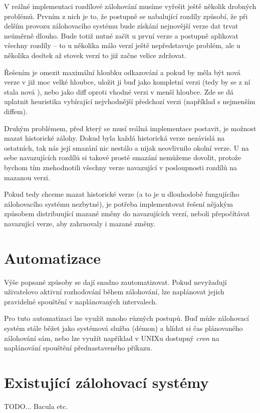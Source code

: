 V reálné implementaci rozdílové zálohování musíme vyřešit ještě několik drobných
problémů. Prvním z nich je to, že postupně se nabalující rozdíly způsobí, že
při delším provozu zálohovacího systému bude získání nejnovější verze dat trvat
neúměrně dlouho. Bude totiž nutné začít u první verze a postupně aplikovat
všechny rozdíly -- to u několika málo verzí ještě nepředstavuje problém, ale
u několika desítek až stovek verzí to již začne velice zdržovat.

Řešením je omezit maximální hloubku odkazování a pokud by měla být nová verze
v již moc velké hloubce, uložit ji buď jako kompletní verzi (tedy by se z ní
stala nová ), nebo jako diff oproti vhodné verzi v menší
hloubce. Zde se dá uplatnit heuristika vybírající nejvhodnější předchozí verzi
(například s nejmenším diffem).

Druhým problémem, před který se musí reálná implementace postavit, je možnost
mazat historické zálohy. Dokud byla každá historická verze nezávislá na
ostatních, tak nás její smazání nic nestálo a nijak neovlivnilo okolní verze.
U na sebe navazujících rozdílů si takové prosté smazání nemůžeme dovolit,
protože bychom tím znehodnotili všechny verze navazující v posloupnosti rozdílů
na mazanou verzi.

Pokud tedy chceme mazat historické verze (a to je u dlouhodobě fungujícího
zálohovacího systému nezbytné), je potřeba implementovat řešení nějakým
způsobem distribuující mazané změny do navazujících verzí, neboli přepočítávat
navazující verze, aby zahrnovaly i mazané změny.

\section{Automatizace}

Výše popsané způsoby se dají snadno zautomatizovat. Pokud nevyžadují uživatelovo
aktivní rozhodování během zálohování, lze naplánovat jejich pravidelné spouštění
v naplánovaných intervalech.

Pro tuto automatizaci lze využít mnoho různých postupů. Buď může zálohovací
systém stále běžet jako systémová služba (démon) a hlídat si čas plánovaného
zálohování sám, nebo lze využít například v \gls{UNIX}u dostupný {\it cron} na
naplánování spouštění přednastaveného příkazu.

\section{Existující zálohovací systémy}

TODO... Bacula etc.

